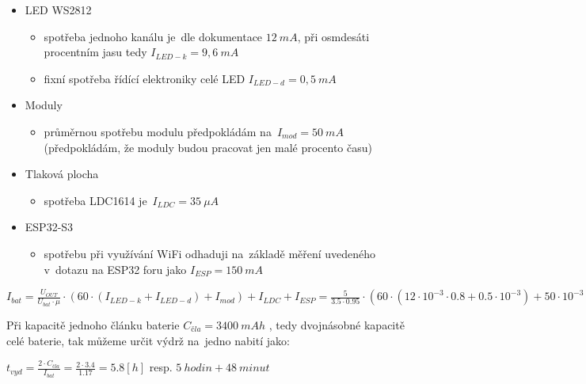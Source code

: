 \begin{itemize}
    \item LED WS2812 \cite{WS2812B-cinsky}
    \begin{itemize}
        \item spotřeba jednoho kanálu je~dle dokumentace \(12~mA\), při osmdesáti procentním jasu tedy \(I_{LED-k} = 9,6~mA\)
        \item fixní spotřeba řídící elektroniky celé LED \(I_{LED-d} = 0,5~mA\)
    \end{itemize}
    \item Moduly 
    \begin{itemize}
        \item průměrnou spotřebu modulu předpokládám na~\(I_{mod} = 50~mA\) (předpokládám, že moduly budou pracovat jen malé procento času) 
    \end{itemize}
    \item Tlaková plocha
    \begin{itemize}
        \item spotřeba LDC1614 je~\(I_{LDC} = 35~\mu A\) \cite{LDC1614}
    \end{itemize}
    \item ESP32-S3
    \begin{itemize}
        \item spotřebu při využívání WiFi odhaduji na~základě měření uvedeného v~dotazu na ESP32 foru \cite{spotreba-ESP32S3} jako \(I_{ESP} = 150~mA\)
    \end{itemize}
\end{itemize}

\vspace{5mm}
\large
\begin{centering}
\(
    I_{bat} = \frac{U_{OUT}}{U_{bat} \cdot \mu} \cdot (60 \cdot (I_{LED-k} + I_{LED-d}) + I_{mod}) + I_{LDC} + I_{ESP} = 
    \frac{5}{3.5 \cdot 0.95} \cdot (60 \cdot (12\cdot10^{-3} \cdot 0.8 + 0.5\cdot10^{-3}) + 50\cdot10^{-3}) + 35\cdot10^{-3} + 150\cdot10^{-3} = 1.17~[A]
\)
\end{centering}
\normalsize
\vspace{1mm}

Při kapacitě jednoho článku baterie \(C_{čla} = 3400~mAh\) \cite{kapacita-18650}, tedy dvojnásobné kapacitě celé baterie, tak můžeme určit výdrž na~jedno nabití jako:

\vspace{3mm}
\large
\( t_{vyd} = \frac{2 \cdot C_{čla}}{I_{bat}} = \frac{2 \cdot 3.4}{1.17} = 5.8 [h] \)  \normalsize resp. \( 5~hodin + 48~minut \)
\vspace{3mm}

